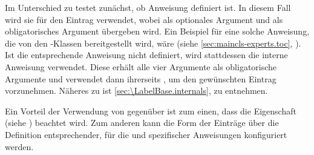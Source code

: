 Im Unterschied zu  testet 
zunächst, ob Anweisung 
definiert ist. In diesem Fall wird sie für den Eintrag verwendet, wobei
 als optionales Argument und  als
obligatorisches Argument übergeben wird. Ein Beispiel für eine solche
Anweisung, die von den \KOMAScript-Klassen bereitgestellt wird, wäre
 (siehe
\autoref{sec:maincls-experts.toc},
). Ist die entsprechende
Anweisung nicht definiert, wird stattdessen die interne Anweisung
 verwendet. Diese erhält
alle vier Argumente als obligatorische Argumente und verwendet dann
ihrerseits , um den gewünschten Eintrag
vorzunehmen. Näheres zu  ist
\autoref{sec:\LabelBase.internals},
 zu entnehmen.

Ein Vorteil der Verwendung von  gegenüber
 ist zum einen, dass die Eigenschaft
 (siehe ) beachtet
wird. Zum anderen kann die Form der Einträge über die Definition
entsprechender, für die  und 
spezifischer Anweisungen konfiguriert werden.%
%
\EndIndexGroup


